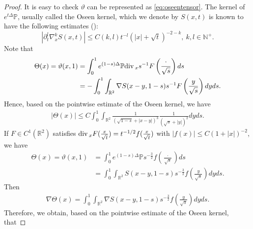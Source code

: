 \documentclass[12pt]{amsart}
\renewcommand{\div}{{\rm div \thinspace }}
\numberwithin{equation}{section}              %
\theoremstyle{remark}
\begin{document}
		\begin{proof}
			It is easy to check $\vartheta$ can be represented as \eqref{eq:oseentensor}. The kernel of $e^{t\Delta}\mathbb{P}$, usually called the Oseen kernel, which we denote by $S(x,t)$ is known to have the following estimates (\cite{BrandoleseJMPA07}):
			\begin{equation*}
				|\partial_t^l\nabla^k_x S(x,t)|\leq C(k,l) t^{-l} (|x|+\sqrt{t})^{-2-k}, ~ k, l\in \mathbb{N}^+.
			\end{equation*}
			Note that
			\begin{equation*}
				\begin{aligned}
					\Theta(x)= \vartheta(x,1) &= \int_0^1  e^{(1-s)\Delta} \mathbb{P} \div_x s^{-1} F\left(\frac{\cdot}{\sqrt{s}}\right) ds\\
					&= 	-\int_0^1 \int_{\mathbb{R}^2}\nabla S(x-y,1-s) s^{-1} F\left(\frac{y}{\sqrt{s}}\right) dy ds.
				\end{aligned}
			\end{equation*}
			Hence, based on the pointwise estimate of the Oseen kernel, we have
			\begin{equation}\label{eq:estTheta}
				\begin{aligned}
					|	\Theta(x)|\leq C \int_0^1 \int_{\mathbb{R}^2}\frac{1}{(\sqrt{1-s}+|x-y|)^3} \frac{1}{(\sqrt{s}+|y|)^2} dy ds.
				\end{aligned}
			\end{equation}
			If $F \in C^1(\mathbb{R}^2)$ satisfies $\div_x F(\frac{x}{\sqrt{t}}) = t^{-1/2} f(\frac{x}{\sqrt{t}})$ with $|f(x)| \leq C(1 + |x|)^{-2}$, 
			we have
			\begin{equation*}
				\begin{aligned}
					\Theta(x)= \vartheta(x,1) &= \int_0^1  e^{(1-s)\Delta} \mathbb{P} s^{-\frac{3}{2}} f\left(\frac{\cdot}{\sqrt{s}}\right) ds\\
					&= 	\int_0^1 \int_{\mathbb{R}^2} S(x-y,1-s)  s^{-\frac{3}{2}} f\left(\frac{y}{\sqrt{s}}\right)  dy ds.
				\end{aligned}
			\end{equation*}
			Then 
			\begin{equation*}
				\begin{aligned}
					\nabla \Theta(x)=  
						\int_0^1 \int_{\mathbb{R}^2} \nabla S(x-y,1-s)  s^{-\frac{3}{2}} f\left(\frac{y}{\sqrt{s}}\right) dy  ds.
				\end{aligned}
			\end{equation*}
			Therefore, we obtain, based on the pointwise estimate of the Oseen kernel, that 

\end{proof}
\end{document}
